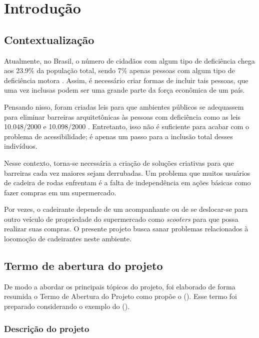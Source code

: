 \chapter[Introdução]{Introdução}

\section{Contextualização}

\par Atualmente, no Brasil, o número de cidadãos com algum tipo de deficiência chega aos 23.9\% da população total, sendo 7\% apenas pessoas com algum tipo de deficiência motora \cite{ibge2010}. Assim, é necessário criar formas de incluir tais pessoas, que uma vez inclusas podem ser uma grande parte da força econômica de um país. 

Pensando nisso, foram criadas leis para que ambientes públicos se adequassem para eliminar barreiras arquitetônicas às pessoas com deficiência como as leis 10.048/2000 e 10.098/2000 \cite{abnt2004}. Entretanto, isso não é suficiente para acabar com o problema de acessibilidade; é apenas um passo para a inclusão total desses indivíduos. 

Nesse contexto, torna-se necessária a criação de soluções criativas para que barreiras cada vez maiores sejam derrubadas. Um problema que muitos usuários de cadeira de rodas enfrentam é a falta de independência em ações básicas como fazer compras em um supermercado.

Por vezes, o cadeirante depende de um acompanhante ou de se deslocar-se para outro veículo de propriedade do supermercado como \textit{scooters} para que possa realizar suas compras. O presente projeto busca sanar problemas relacionados à locomoção de cadeirantes neste ambiente.

\section{Termo de abertura do projeto}
De modo a abordar os principais tópicos do projeto, foi elaborado de forma resumida o Termo de Abertura do Projeto como propõe o \citeauthor{pmbok2013guia} (\citeyear{pmbok2013guia}). Esse termo foi preparado considerando o exemplo do \citeauthor{lappis_tap} (\citeyear{lappis_tap}).

\subsection{Descrição do projeto}

